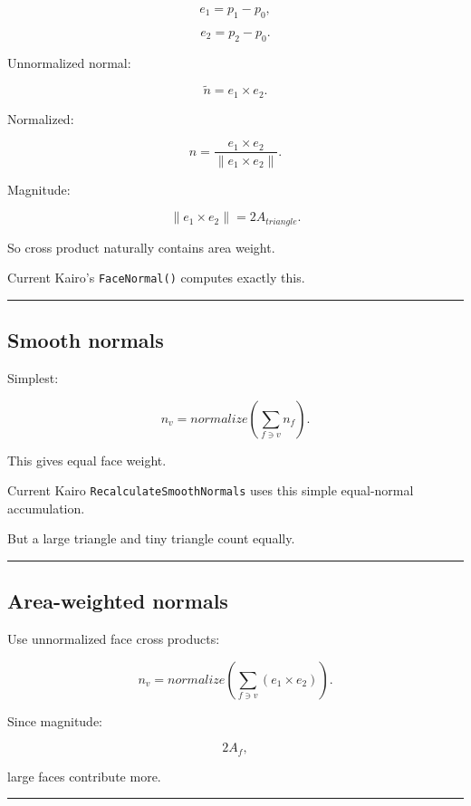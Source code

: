 \[
e_1=p_1-p_0,
\]

\[
e_2=p_2-p_0.
\]

Unnormalized normal:

\[
\tilde n=
e_1\times e_2.
\]

Normalized:

\[
\boxed{
n=
\frac{
e_1\times e_2
}{
\|e_1\times e_2\|
}.
}
\]

Magnitude:

\[
\|e_1\times e_2\|
=
2A_{triangle}.
\]

So cross product naturally contains area weight.

Current Kairo's \texttt{FaceNormal()} computes exactly this.

\begin{center}\rule{0.5\linewidth}{0.5pt}\end{center}

\subsection{Smooth normals}\label{04-visual-computing-ii-ch041-smooth-normals}

Simplest:

\[
n_v=
normalize
\left(
\sum_{f\ni v}
n_f
\right).
\]

This gives equal face weight.

Current Kairo \texttt{RecalculateSmoothNormals} uses this simple equal-normal accumulation.

But a large triangle and tiny triangle count equally.

\begin{center}\rule{0.5\linewidth}{0.5pt}\end{center}

\subsection{Area-weighted normals}\label{04-visual-computing-ii-ch041-area-weighted-normals}

Use unnormalized face cross products:

\[
\boxed{
n_v
=
normalize
\left(
\sum_{f\ni v}
(e_1\times e_2)
\right).
}
\]

Since magnitude:

\[
2A_f,
\]

large faces contribute more.

\begin{center}\rule{0.5\linewidth}{0.5pt}\end{center}

